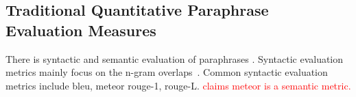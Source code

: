 \subsection{Traditional Quantitative Paraphrase Evaluation Measures}
\label{subsec:traditional_quantitative_evaluation_measures}



There is syntactic and semantic evaluation of paraphrases \citep{gohsen_captions_2023}.
Syntactic evaluation metrics mainly focus on the n-gram overlaps~\citet{zhou_paraphrase_2021}. 
Common syntactic evaluation metrics include \ac{bleu}, \ac{meteor} \ac{rouge}-1, \ac{rouge}-L.
\textcolor{red}{\citet{kurt_pehlivanoglu_comparative_2024} claims \ac{meteor} is a semantic metric.}

